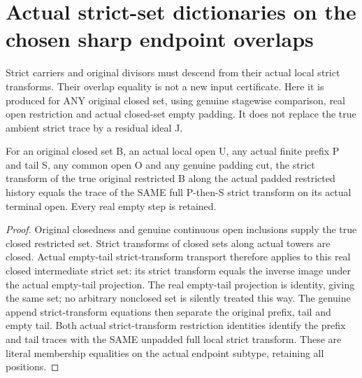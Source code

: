 \section{Actual strict-set dictionaries on the chosen sharp endpoint overlaps}

Strict carriers and original divisors must descend from their actual local
strict transforms. Their overlap equality is not a new input certificate.
Here it is produced for ANY original closed set, using genuine stagewise
comparison, real open restriction and actual closed-set empty padding.
It does not replace the true ambient strict trace by a residual ideal J.

\begin{lemma}
\label{hir:sharp-actual-padded-local-strict-set-dictionary}
\leanok
{}
For an original closed set B, an actual local open U, any actual finite
prefix P and tail S, any common open O and any genuine padding cut, the
strict transform of the true original restricted B along the actual padded
restricted history equals the trace of the SAME full P-then-S strict
transform on its actual terminal open. Every real empty step is retained.
\end{lemma}
\begin{proof}
Original closedness and genuine continuous open inclusions supply the true
closed restricted set. Strict transforms of closed sets along actual towers
are closed. Actual empty-tail strict-transform transport therefore applies
to this real closed intermediate strict set: its strict transform equals the
inverse image under the actual empty-tail projection. The real empty-tail
projection is identity, giving the same set; no arbitrary nonclosed set is
silently treated this way. The genuine append strict-transform equations
then separate the original prefix, tail and empty tail. Both actual
strict-transform restriction identities identify the prefix and tail traces
with the SAME unpadded full local strict transform. These are literal
membership equalities on the actual endpoint subtype, retaining all positions.
\end{proof}

